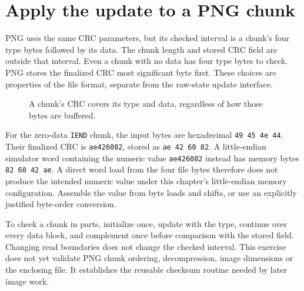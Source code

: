 \section{Apply the update to a PNG chunk}
PNG uses the same CRC parameters, but its checked interval is a chunk's four type bytes
followed by its data. The chunk length and stored CRC field are outside that interval.
Even a chunk with no data has four type bytes to check. PNG stores the finalized CRC
most significant byte first. These choices are properties of the file format, separate
from the raw-state update interface.

\begin{figure}[htbp]
  \centering
  \caption{A chunk's CRC covers its type and data, regardless of how those bytes are buffered.}
\end{figure}

For the zero-data \texttt{IEND} chunk, the input bytes are hexadecimal
\texttt{49 45 4e 44}. Their finalized CRC is \texttt{ae426082}, stored as
\texttt{ae 42 60 82}. A little-endian simulator word containing the numeric value
\texttt{ae426082} instead has memory bytes \texttt{82 60 42 ae}. A direct word
load from the four file bytes therefore does not produce the intended numeric value
under this chapter's little-endian memory configuration. Assemble the value from byte
loads and shifts, or use an explicitly justified byte-order conversion.

To check a chunk in parts, initialize once, update with the type, continue over every
data block, and complement once before comparison with the stored field. Changing
read boundaries does not change the checked interval. This exercise does not yet
validate PNG chunk ordering, decompression, image dimensions or the enclosing file.
It establishes the reusable checksum routine needed by later image work.
